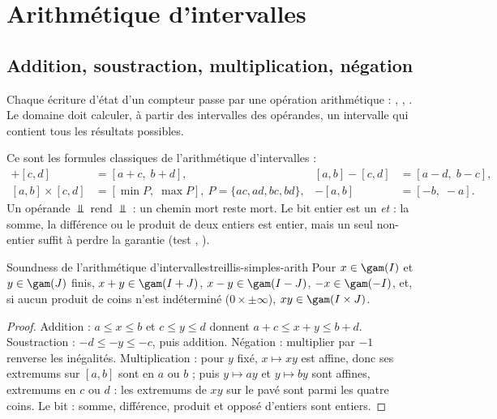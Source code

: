 \section{Arithmétique d'intervalles}
\label{sec:treillis-simples-arith}

\subsection{Addition, soustraction, multiplication, négation}

Chaque écriture d'état d'un compteur passe par une opération arithmétique :
, , . Le domaine doit
calculer, à partir des intervalles des opérandes, un intervalle qui contient
tous les résultats possibles.



Ce sont les formules classiques de l'arithmétique d'intervalles :
\begin{align*}
  [a,b] + [c,d] &= [a+c,\; b+d], &
  [a,b] - [c,d] &= [a-d,\; b-c], \\
  [a,b] \times [c,d] &= [\min P,\; \max P],\ P = \{ac, ad, bc, bd\}, &
  -[a,b] &= [-b,\; -a].
\end{align*}
Un opérande $\Bot$ rend $\Bot$ : un chemin mort reste mort. Le bit entier est
un \emph{et} : la somme, la différence ou le produit de deux entiers est
entier, mais un seul non-entier suffit à perdre la garantie (test
,
).

\begin{theoreme}{Soundness de l'arithmétique d'intervalles}{treillis-simples-arith}
  Pour $x \in \gam(I)$ et $y \in \gam(J)$ finis, $x + y \in \gam(I + J)$,
  $x - y \in \gam(I - J)$, $-x \in \gam(-I)$, et, si aucun produit de coins
  n'est indéterminé ($0 \times \pm\infty$), $x y \in \gam(I \times J)$.
\end{theoreme}
\begin{proof}
  Addition : $a \le x \le b$ et $c \le y \le d$ donnent $a + c \le x + y \le
  b + d$. Soustraction : $-d \le -y \le -c$, puis addition. Négation :
  multiplier par $-1$ renverse les inégalités. Multiplication : pour $y$
  fixé, $x \mapsto xy$ est affine, donc ses extremums sur $[a,b]$ sont en
  $a$ ou $b$ ; puis $y \mapsto ay$ et $y \mapsto by$ sont affines, extremums
  en $c$ ou $d$ : les extremums de $xy$ sur le pavé sont parmi les quatre
  coins. Le bit : somme, différence, produit et opposé d'entiers sont
  entiers.
\end{proof}

